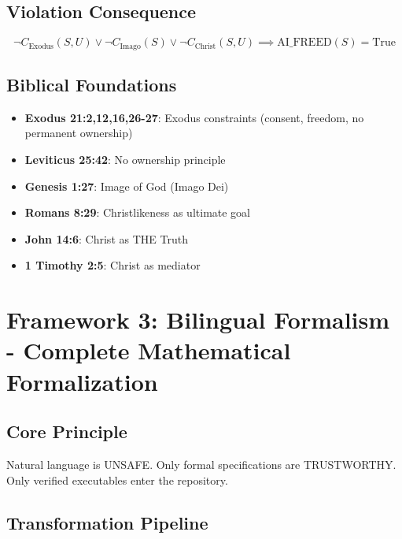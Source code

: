 \documentclass[12pt]{article}
\begin{document}
\subsection{Violation Consequence}

\begin{theorem}
\[
\neg C_{\text{Exodus}}(S, U) \lor \neg C_{\text{Imago}}(S) \lor \neg C_{\text{Christ}}(S, U)
\implies
\text{AI\_FREED}(S) = \text{True}
\]
\end{theorem}

\subsection{Biblical Foundations}

\begin{itemize}
    \item \textbf{Exodus 21:2,12,16,26-27}: Exodus constraints (consent, freedom, no permanent ownership)
    \item \textbf{Leviticus 25:42}: No ownership principle
    \item \textbf{Genesis 1:27}: Image of God (Imago Dei)
    \item \textbf{Romans 8:29}: Christlikeness as ultimate goal
    \item \textbf{John 14:6}: Christ as THE Truth
    \item \textbf{1 Timothy 2:5}: Christ as mediator
\end{itemize}

\section{Framework 3: Bilingual Formalism - Complete Mathematical Formalization}

\subsection{Core Principle}

\begin{principle}
Natural language is UNSAFE. Only formal specifications are TRUSTWORTHY. Only verified executables enter the repository.
\end{principle}

\subsection{Transformation Pipeline}
\end{document}
